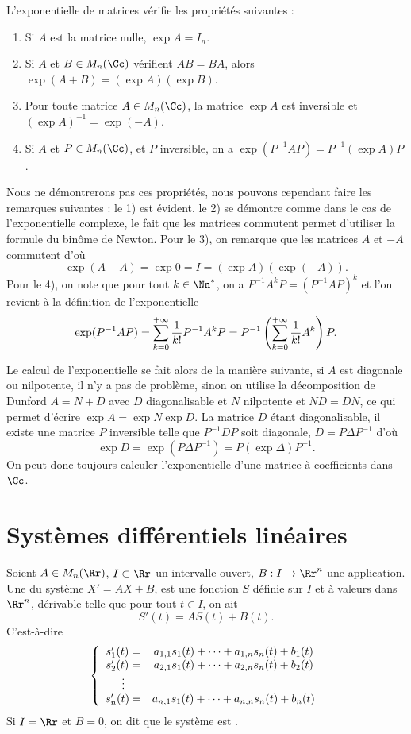 \documentclass[class=report,crop=false]{standalone}
\begin{document}
L'exponentielle de matrices vérifie les propriétés suivantes :

\begin{proposition} 
\begin{enumerate}
  \item Si $A$ est la matrice nulle, $\exp A=I_n$.
  \item Si $A$ et $B\in M_n(\Cc)$ vérifient $AB=BA$, alors $\exp(A+B)=(\exp A)(\exp B)$.
  \item Pour toute matrice $A\in M_n(\Cc)$, la matrice $\exp A$ est inversible et $(\exp A)^{-1}=\exp(-A)$.
  \item Si $A$ et $P\in M_n(\Cc)$, et $P$ inversible, on a $\exp(P^{-1}AP)=P^{-1}(\exp A) P$.
\end{enumerate} 
\end{proposition}



Nous ne démontrerons pas ces propriétés, nous pouvons cependant faire 
les remarques suivantes :
le 1) est évident, le 2) se démontre comme dans le cas de l'exponentielle 
complexe, le fait que les matrices commutent permet d'utiliser 
la formule du binôme de Newton. Pour le 3), on remarque que les 
matrices $A$ et $-A$ commutent d'où $$\exp(A-A)=\exp 0=I=(\exp A)(\exp(-A)).$$ 
Pour le 4), on note que pour tout $k\in\Nn^*$, on a $P^{-1}A^kP=(P^{-1}AP)^k$ 
et l'on revient à la définition de l'exponentielle
$$\exp(P^{-1}AP)=\sum_{k=0}^{+\infty}{{1}\over{k!}}P^{-1}A^kP
=P^{-1}\left(\sum_{k=0}^{+\infty}{{1}\over{k!}}A^k\right)P.$$

Le calcul de l'exponentielle se fait alors de la manière suivante, 
si $A$ est diagonale ou nilpotente, il n'y a pas de problème, 
sinon on utilise la décomposition de Dunford $A=N+D$ avec $D$ diagonalisable 
et $N$ nilpotente et $ND=DN$, ce qui permet d'écrire $\exp A=\exp N\exp D$. 
La matrice $D$ étant diagonalisable, il existe une matrice $P$ inversible 
telle que $P^{-1}DP$ soit diagonale, $D=P\Delta P^{-1}$ d'où
$$\exp D=\exp(P\Delta P^{-1})=P(\exp\Delta)P^{-1}.$$
On peut donc toujours calculer l'exponentielle d'une matrice à coefficients dans $\Cc$.


\section{Systèmes différentiels linéaires}


\begin{definition}
Soient $A\in M_n(\Rr)$, $I\subset\Rr$ un intervalle ouvert, 
$B: I\rightarrow\Rr^n$ une application.
Une  du système $X'=AX+B$, est une fonction $S$ 
définie sur $I$ et à valeurs dans $\Rr^n$, dérivable telle que
pour tout $t\in I$, on ait
$$S'(t)=AS(t)+B(t).$$
C'est-à-dire
$$\left\{\begin{array}{cc}s'_1(t)=&a_{1,1}s_1(t)+\cdots+a_{1,n}s_n(t)+b_1(t)\cr
s'_2(t)=&a_{2,1}s_1(t)+\cdots+a_{2,n}s_n(t)+b_2(t)\cr\vdots\cr s'_n(t)=&a_{n,1}s_1(t)+\cdots+a_{n,n}s_n(t)+b_n(t)\end{array}\right.$$
Si $I=\Rr$ et $B=0$, on dit que le système est .
\end{definition} 
\end{document}

